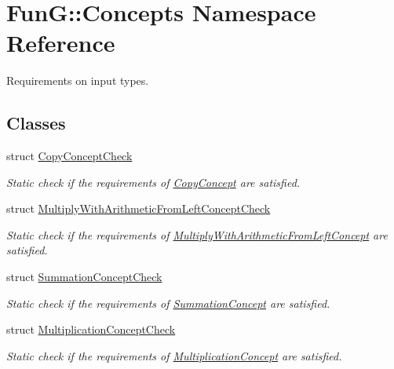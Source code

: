 \hypertarget{namespaceFunG_1_1Concepts}{\section{\-Fun\-G\-:\-:\-Concepts \-Namespace \-Reference}
\label{namespaceFunG_1_1Concepts}
}


\-Requirements on input types.  


\subsection*{\-Classes}
\begin{DoxyCompactItemize}
\item 
struct \hyperlink{structFunG_1_1Concepts_1_1CopyConceptCheck}{\-Copy\-Concept\-Check}
\begin{DoxyCompactList}\small\item\em \-Static check if the requirements of \hyperlink{structFunG_1_1Concepts_1_1CopyConcept}{\-Copy\-Concept} are satisfied. \end{DoxyCompactList}\item 
struct \hyperlink{structFunG_1_1Concepts_1_1MultiplyWithArithmeticFromLeftConceptCheck}{\-Multiply\-With\-Arithmetic\-From\-Left\-Concept\-Check}
\begin{DoxyCompactList}\small\item\em \-Static check if the requirements of \hyperlink{structFunG_1_1Concepts_1_1MultiplyWithArithmeticFromLeftConcept}{\-Multiply\-With\-Arithmetic\-From\-Left\-Concept} are satisfied. \end{DoxyCompactList}\item 
struct \hyperlink{structFunG_1_1Concepts_1_1SummationConceptCheck}{\-Summation\-Concept\-Check}
\begin{DoxyCompactList}\small\item\em \-Static check if the requirements of \hyperlink{structFunG_1_1Concepts_1_1SummationConcept}{\-Summation\-Concept} are satisfied. \end{DoxyCompactList}\item 
struct \hyperlink{structFunG_1_1Concepts_1_1MultiplicationConceptCheck}{\-Multiplication\-Concept\-Check}
\begin{DoxyCompactList}\small\item\em \-Static check if the requirements of \hyperlink{structFunG_1_1Concepts_1_1MultiplicationConcept}{\-Multiplication\-Concept} are satisfied. \end{DoxyCompactList}\item 

\end{DoxyCompactItemize}
